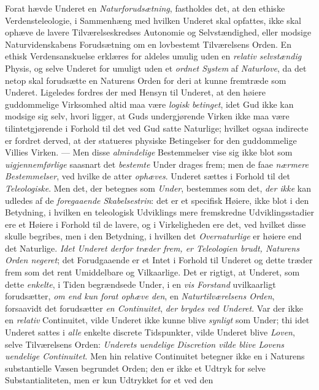 \documentclass[12pt,a4paper]{book}
\newcommand{\opage}[1]{\marginnote{\footnotesize\textit{[#1]}}}
\begin{document}
Forat hævde Underet en \emph{Naturforudsætning}, fastholdes det, at den ethiske
Verdensteleologie, i Sammenhæng med hvilken Underet skal opfattes, ikke skal
ophæve de lavere Tilværelseskredses Autonomie og Selvstændighed, eller modsige
Naturvidenskabens Forudsætning om en lovbestemt Tilværelsens Orden. En ethisk
Verdensanskuelse erklæres for aldeles umulig uden en \emph{relativ selvstændig} Physis,
og selve Underet for umuligt uden et \emph{ordnet System} af \emph{Naturlove}, da det netop skal
forudsætte en Naturens Orden for deri at kunne fremtræde som Underet. Ligeledes
fordres der med Hensyn til Underet, at den høiere guddommelige Virksomhed altid maa
være \emph{logisk betinget}, idet Gud ikke kan modsige sig selv, hvori ligger, at Guds
undergjørende Virken ikke maa være tilintetgjørende i Forhold til det ved Gud satte
Naturlige; hvilket ogsaa indirecte er fordret derved, at der statueres physiske
Betingelser for den guddommelige Villies Virken. --- Men disse \emph{almindelige} Bestemmelser vise sig ikke blot som \emph{uigjennemførlige} saasnart det \emph{bestemte}
Under drages frem; men de faae \emph{nærmere Bestemmelser}, ved hvilke de atter \emph{ophæves}.
Underet sættes i Forhold til det \emph{Teleologiske}. Men det, der betegnes som \emph{Under}, bestemmes som det, \emph{der ikke} kan udledes af de \emph{foregaaende Skabelsestrin}: det \opage{81}er et
specifisk Høiere, ikke blot i den Betydning, i hvilken en teleologisk Udviklings mere
fremskredne Udviklingsstadier ere et Høiere i Forhold til de lavere, og i Virkeligheden
ere det, ved hvilket disse skulle begribes, men i den Betydning, i hvilken det \emph{Overnaturlige} er høiere end det Naturlige. \emph{Idet Underet derfor træder frem, er
Teleologien brudt, Naturens Orden negeret}; det Forudgaaende er et Intet i Forhold til
Underet og dette træder frem som det rent Umiddelbare og Vilkaarlige. Det er rigtigt, at
Underet, som dette \emph{enkelte}, i Tiden begrændsede Under, i en \emph{vis Forstand} uvilkaarligt
forudsætter, \emph{om end kun forat ophæve den}, en \emph{Naturtilværelsens Orden}, forsaavidt
det forudsætter \emph{en Continuitet}, \emph{der brydes ved Underet}. Var der ikke en \emph{relativ}
Continuitet, vilde Underet ikke kunne blive \emph{synligt} som Under; thi idet Underet sattes i \emph{alle} enkelte discrete Tidspunkter, vilde Underet blive \emph{Loven}, selve Tilværelsens Orden:
\emph{Underets uendelige Discretion vilde blive Lovens uendelige Continuitet}. Men hin
relative Continuitet betegner ikke en i Naturens substantielle Væsen begrundet Orden;
den er ikke et Udtryk for selve Substantialiteten, men er kun Udtrykket for et ved den
\end{document}
